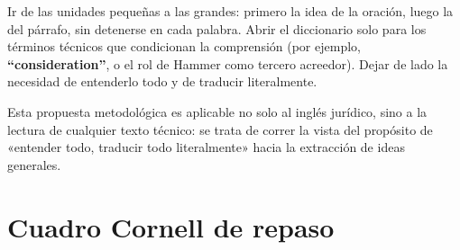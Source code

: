 \documentclass[12pt,oneside]{book}
\begin{document}
\begin{note}
Ir de las unidades pequeñas a las grandes: primero la idea de la oración, luego la del párrafo, sin detenerse en cada palabra. Abrir el diccionario solo para los términos técnicos que condicionan la comprensión (por ejemplo, \textbf{``consideration''}, o el rol de Hammer como tercero acreedor). Dejar de lado la necesidad de entenderlo todo y de traducir literalmente.
\end{note}

Esta propuesta metodológica es aplicable no solo al inglés jurídico, sino a la lectura de cualquier texto técnico: se trata de correr la vista del propósito de «entender todo, traducir todo literalmente» hacia la extracción de ideas generales.

\section{Cuadro Cornell de repaso}
\end{document}
